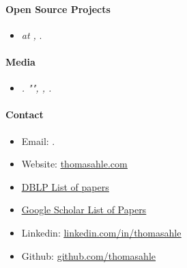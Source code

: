 \documentclass[11pt]{article}
\begin{document}
\paragraph{Open Source Projects}
\begin{itemize}
      \item[]
      \emph{ at , }.
      \\
\end{itemize}


\paragraph{Media}
\begin{itemize}
   \item[]
      \emph{.
         "", , .}
\end{itemize}

\paragraph{Contact}
\begin{itemize}
   \item[]
      Email: \href{mailto:\VAR{authors['thdy'].email}}{}.
   \item[]
      Website: \href{http://www.thomasahle.com}{\underline{thomasahle.com}}
   \item[]
      \href{https://dblp1.uni-trier.de/pers/hd/a/Ahle:Thomas_D=}{\underline{DBLP List of papers}}
   \item[]
      \href{https://scholar.google.dk/citations?user=aRiVoYgAAAAJ}{\underline{Google Scholar List of Papers}}
   \item[]
      Linkedin: \href{https://www.linkedin.com/in/thomasahle/}{\underline{linkedin.com/in/thomasahle}}
   \item[]
      Github: \href{https://github.com/thomasahle}{\underline{github.com/thomasahle}}
\end{itemize}
\end{document}
